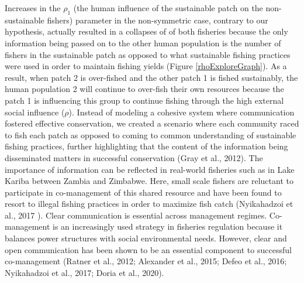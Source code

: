 \documentclass[
  12pt,
]{article}
\begin{document}
Increases in the \(\rho_1\) (the human influence of the sustainable patch on the non-sustainable fishers) parameter in the non-symmetric case, contrary to our hypothesis, actually resulted in a collapses of of both fisheries because the only information being passed on to the other human population is the number of fishers in the sustainable patch as opposed to what sustainable fishing practices were used in order to maintain fishing yields (Figure \ref{rhoExploreGraph}). As a result, when patch 2 is over-fished and the other patch 1 is fished sustainably, the human population 2 will continue to over-fish their own resources because the patch 1 is influencing this group to continue fishing through the high external social influence (\(\rho\)). Instead of modeling a cohesive system where communication fostered effective conservation, we created a scenario where each community raced to fish each patch as opposed to coming to common understanding of sustainable fishing practices, further highlighting that the content of the information being disseminated matters in successful conservation (Gray et al., 2012). The importance of information can be reflected in real-world fisheries such as in Lake Kariba between Zambia and Zimbabwe. Here, small scale fishers are reluctant to participate in co-management of this shared resource and have been found to resort to illegal fishing practices in order to maximize fish catch (Nyikahadzoi et al., 2017 ). Clear communication is essential across management regimes. Co-management is an increasingly used strategy in fisheries regulation because it balances power structures with social environmental needs. However, clear and open communication has been shown to be an essential component to successful co-management (Ratner et al., 2012; Alexander et al., 2015; Defeo et al., 2016; Nyikahadzoi et al., 2017; Doria et al., 2020).
\end{document}
